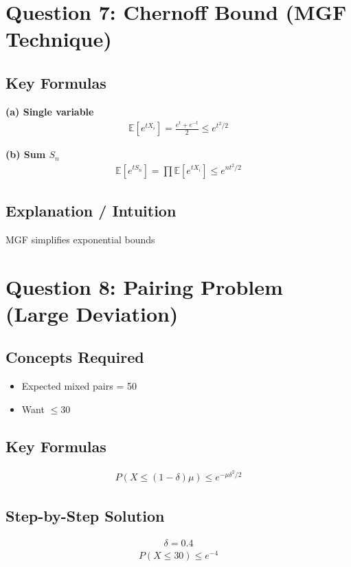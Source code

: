 \documentclass{article}
\begin{document}
\section{Question 7: Chernoff Bound (MGF Technique)}

\subsection{Key Formulas}

\textbf{(a) Single variable}
\begin{align}
\mathbb{E}[e^{tX_i}] = \frac{e^t + e^{-t}}{2} \le e^{t^2/2}
\end{align}

\textbf{(b) Sum $S_n$}
\begin{align}
\mathbb{E}[e^{tS_n}] = \prod \mathbb{E}[e^{tX_i}] \le e^{nt^2/2}
\end{align}

\subsection{Explanation / Intuition}
MGF simplifies exponential bounds

\section{Question 8: Pairing Problem (Large Deviation)}

\subsection{Concepts Required}
\begin{itemize}
\item Expected mixed pairs = 50
\item Want $\le 30$
\end{itemize}

\subsection{Key Formulas}
\begin{align}
P(X \le (1-\delta)\mu) \le e^{-\mu \delta^2 / 2}
\end{align}

\subsection{Step-by-Step Solution}
\begin{align}
\delta = 0.4
\end{align}
\begin{align}
P(X \le 30) \le e^{-4}
\end{align}
\end{document}

